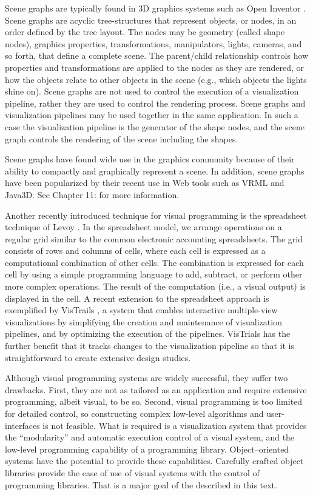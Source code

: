 Scene graphs are typically found in 3D graphics systems such as Open Inventor \cite{Wernecke94}. Scene graphs are acyclic tree-structures that represent objects, or nodes, in an order defined by the tree layout. The nodes may be geometry (called shape nodes), graphics properties, transformations, manipulators, lights, cameras, and so forth, that define a complete scene. The parent/child relationship controls how properties and transformations are applied to the nodes as they are rendered, or how the objects relate to other objects in the scene (e.g., which objects the lights shine on). Scene graphs are not used to control the execution of a visualization pipeline, rather they are used to control the rendering process. Scene graphs and visualization pipelines may be used together in the same application. In such a case the visualization pipeline is the generator of the shape nodes, and the scene graph controls the rendering of the scene including the shapes.

Scene graphs have found wide use in the graphics community because of their ability to compactly and graphically represent a scene. In addition, scene graphs have been popularized by their recent use in Web tools such as VRML and Java3D. See Chapter 11:  for more information.

Another recently introduced technique for visual programming is the spreadsheet technique of Levoy \cite{Levoy94}. In the spreadsheet model, we arrange operations on a regular grid similar to the common electronic accounting spreadsheets. The grid consists of rows and columns of cells, where each cell is expressed as a computational combination of other cells. The combination is expressed for each cell by using a simple programming language to add, subtract, or perform other more complex operations. The result of the computation (i.e., a visual output) is displayed in the cell. A recent extension to the spreadsheet approach is exemplified by VisTrails \cite{Bavoil05}, a system that enables interactive multiple-view visualizations by simplifying the creation and maintenance of visualization pipelines, and by optimizing the execution of the pipelines. VisTrials has the further benefit that it tracks changes to the visualization pipeline so that it is straightforward to create extensive design studies.

Although visual programming systems are widely successful, they suffer two drawbacks. First, they are not as tailored as an application and require extensive programming, albeit visual, to be so. Second, visual programming is too limited for detailed control, so constructing complex low-level algorithms and user-interfaces is not feasible. What is required is a visualization system that provides the ``modularity'' and automatic execution control of a visual system, and the low-level programming capability of a programming library. Object--oriented systems have the potential to provide these capabilities. Carefully crafted object libraries provide the ease of use of visual systems with the control of programming libraries. That is a major goal of the described in this text.

